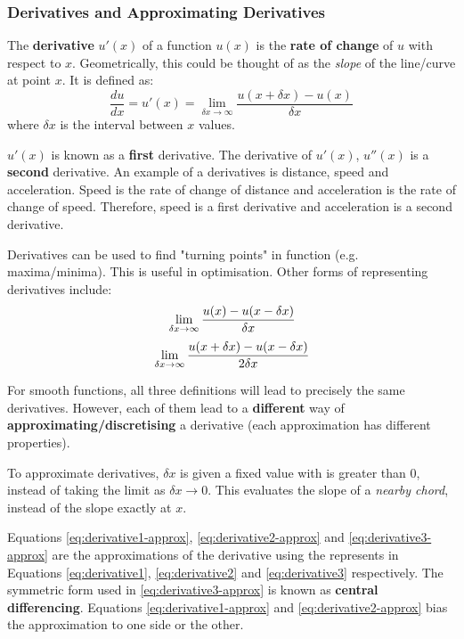 \documentclass{article}
\begin{document}
\subsubsection{Derivatives and Approximating Derivatives}
The \textbf{derivative} $u'(x)$ of a function $u(x)$ is the \textbf{rate of change} of $u$ with respect to $x$. Geometrically, this could be thought of as the \textit{slope} of the line/curve at point $x$. It is defined as:
\begin{equation}
	\frac{du}{dx} = u'(x) = \lim_{\delta x \rightarrow \infty} \frac{u(x + \delta x) - u(x)}{\delta x}
	\label{eq:derivative1}
\end{equation}
where $\delta x$ is the interval between $x$ values.

$u'(x)$ is known as a \textbf{first} derivative. The derivative of $u'(x)$, $u''(x)$  is a \textbf{second} derivative. An example of a derivatives is distance, speed and acceleration. Speed is the rate of change of distance and acceleration is the rate of change of speed. Therefore, speed is a first derivative and acceleration is a second derivative.

Derivatives can be used to find "turning points" in function (e.g. maxima/minima). This is useful in optimisation.  Other forms of representing derivatives include:
\begin{equation}\\
	\lim_{\delta x \rightarrow \infty} \frac{u(x) - u(x - \delta x)}{\delta x}
	\label{eq:derivative2}
\end{equation}
\begin{equation}\\
	\lim_{\delta x \rightarrow \infty} \frac{u(x + \delta x) - u(x - \delta x)}{2\delta x} \\
	\label{eq:derivative3}
\end{equation}

For smooth functions, all three definitions will lead to precisely the same derivatives. However, each of them lead to a \textbf{different} way of \textbf{approximating/discretising} a derivative (each approximation has different properties).

To approximate derivatives, $\delta x$ is given a fixed value with is greater than 0, instead of taking the limit as $\delta x \rightarrow 0$. This evaluates the slope of a \textit{nearby chord}, instead of the slope exactly at $x$. 

Equations \ref{eq:derivative1-approx}, \ref{eq:derivative2-approx} and \ref{eq:derivative3-approx} are the approximations of the derivative using the represents in Equations \ref{eq:derivative1}, \ref{eq:derivative2} and \ref{eq:derivative3} respectively. The symmetric form used in  \ref{eq:derivative3-approx} is known as \textbf{central differencing}. Equations \ref{eq:derivative1-approx}  and \ref{eq:derivative2-approx}  bias the approximation to one side or the other.
\end{document}

